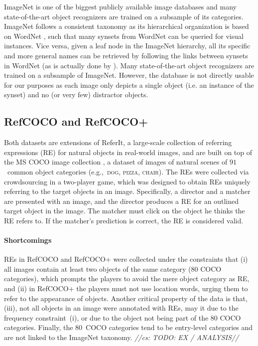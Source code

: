 \documentclass[runningheads]{llncs}
\newcommand{\cs}[1]{\textcolor{PineGreen}{\emph{//cs: #1//}}}
\newcommand{\referit}{ReferIt\xspace}
\newcommand{\refcoco}{RefCOCO\xspace}
\newcommand{\refcocop}{RefCOCO+\xspace}
\newcommand{\cat}[1]{\textsc{#1}}
\begin{document}
ImageNet \cite{imagenet_cvpr09} is one of the biggest publicly available image databases and many state-of-the-art object recognizers are trained on a subsample of its categories. ImageNet follows a consistent taxonomy as its hierarchical organization is based on WordNet \cite{fellbaum1998wordnet}, such that many synsets from WordNet can be queried for visual instances.
Vice versa, given a leaf node in the ImageNet hierarchy, all its specific and more general names can be retrieved by following the links between synsets in WordNet (as is actually done by \cite{Ordonez:2016}).
Many state-of-the-art object recognizers are trained on a subsample of ImageNet.
However, the database is not directly usable for our purposes as each image only depicts a single object (i.e. an instance of the synset) and no (or very few) distractor objects. 


\subsection{\refcoco and \refcocop \cite{Yu2016}}
Both datasets are extensions of \referit\cite{Kazemzadeh2014}, a large-scale collection of referring expressions (RE) for natural objects in real-world images, and are built on top of the MS COCO image collection \cite{mscoco}, 
a dataset of images of natural scenes of $91$~common object categories (e.g.,~\cat{dog, pizza, chair}). 
The REs were collected via crowdsourcing in a two-player game, which was designed to obtain REs uniquely referring to the target objects in an image. 
Specifically, a director and a matcher are presented with an image, and the director produces a RE for an outlined target object in the image. 
The matcher must click on the object he thinks the RE refers to. %
If the matcher's prediction is correct, the RE is considered valid.


\paragraph{Shortcomings}
REs in \refcoco and \refcocop were collected under the constraints that (i) all images contain at least two objects of the same category (80 COCO categories), which prompts the players to avoid the mere object category as RE, and (ii) in \refcocop the players must not use location words, urging them to refer to the appearance of objects. 
Another critical property of the data is that, (iii), not all objects in an image were annotated with REs, may it due to the frequency constraint~(i), or due to the object not being part of the 80 COCO categories. 
Finally, the $80$~COCO categories tend to be entry-level categories and are not linked to the ImageNet taxonomy. \cs{TODO: EX / ANALYSIS}
\end{document}
